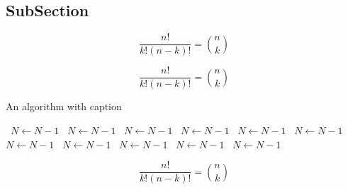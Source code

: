 \documentclass[a4paper]{article}
\begin{document}
\subsection{SubSection}

\[ \frac{n!}{k!(n-k)!} = \binom{n}{k} \]

\[ \frac{n!}{k!(n-k)!} = \binom{n}{k} \]

\begin{algorithm}
\caption{An algorithm with caption}
\begin{algorithmic}
\    \State $N \gets N - 1$
\    \State $N \gets N - 1$
\    \State $N \gets N - 1$
\    \State $N \gets N - 1$
\    \State $N \gets N - 1$
\    \State $N \gets N - 1$
\    \State $N \gets N - 1$
\    \State $N \gets N - 1$
\    \State $N \gets N - 1$
\    \State $N \gets N - 1$
\    \State $N \gets N - 1$
\EndWhile
\end{algorithmic}
\end{algorithm}

\[ \frac{n!}{k!(n-k)!} = \binom{n}{k} \]
\end{document}
